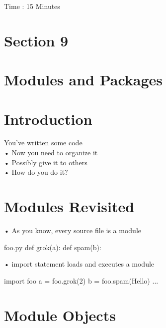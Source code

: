 \documentclass[
  letterpaper,
  DIV=11,
  numbers=noendperiod]{scrreprt}
\newenvironment{Shaded}{\begin{snugshade}}{\end{snugshade}}
\newcommand{\NormalTok}[1]{\textcolor[rgb]{0.00,0.23,0.31}{#1}}
\begin{document}
Time : 15 Minutes


\chapter{Section 9}\label{section-9}


\chapter{Modules and Packages}\label{modules-and-packages}


\chapter{Introduction}\label{introduction-1}

You've written some code\\
• Now you need to organize it\\
• Possibly give it to others\\
• How do you do it?


\chapter{Modules Revisited}\label{modules-revisited}

• As you know, every source file is a module

\begin{Shaded}
\begin{Highlighting}[]
\NormalTok{foo.py def grok(a): def spam(b): }
\end{Highlighting}
\end{Shaded}

• import statement loads and executes a module

\begin{Shaded}
\begin{Highlighting}[]
\NormalTok{import foo  }
\NormalTok{a = foo.grok(2)  }
\NormalTok{b = foo.spam(\textquotesingle{}Hello\textquotesingle{})  }
\NormalTok{... }
\end{Highlighting}
\end{Shaded}


\chapter{Module Objects}\label{module-objects}
\end{document}
